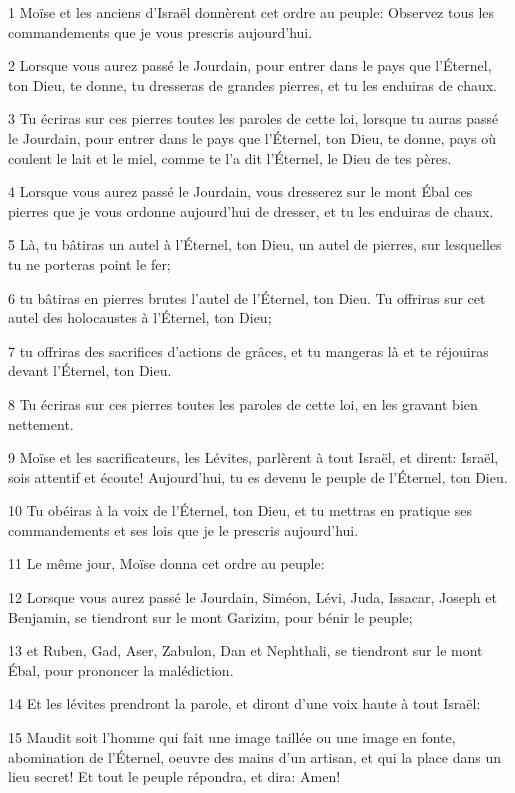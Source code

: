 \par 1 Moïse et les anciens d'Israël donnèrent cet ordre au peuple: Observez tous les commandements que je vous prescris aujourd'hui.
\par 2 Lorsque vous aurez passé le Jourdain, pour entrer dans le pays que l'Éternel, ton Dieu, te donne, tu dresseras de grandes pierres, et tu les enduiras de chaux.
\par 3 Tu écriras sur ces pierres toutes les paroles de cette loi, lorsque tu auras passé le Jourdain, pour entrer dans le pays que l'Éternel, ton Dieu, te donne, pays où coulent le lait et le miel, comme te l'a dit l'Éternel, le Dieu de tes pères.
\par 4 Lorsque vous aurez passé le Jourdain, vous dresserez sur le mont Ébal ces pierres que je vous ordonne aujourd'hui de dresser, et tu les enduiras de chaux.
\par 5 Là, tu bâtiras un autel à l'Éternel, ton Dieu, un autel de pierres, sur lesquelles tu ne porteras point le fer;
\par 6 tu bâtiras en pierres brutes l'autel de l'Éternel, ton Dieu. Tu offriras sur cet autel des holocaustes à l'Éternel, ton Dieu;
\par 7 tu offriras des sacrifices d'actions de grâces, et tu mangeras là et te réjouiras devant l'Éternel, ton Dieu.
\par 8 Tu écriras sur ces pierres toutes les paroles de cette loi, en les gravant bien nettement.
\par 9 Moïse et les sacrificateurs, les Lévites, parlèrent à tout Israël, et dirent: Israël, sois attentif et écoute! Aujourd'hui, tu es devenu le peuple de l'Éternel, ton Dieu.
\par 10 Tu obéiras à la voix de l'Éternel, ton Dieu, et tu mettras en pratique ses commandements et ses lois que je le prescris aujourd'hui.
\par 11 Le même jour, Moïse donna cet ordre au peuple:
\par 12 Lorsque vous aurez passé le Jourdain, Siméon, Lévi, Juda, Issacar, Joseph et Benjamin, se tiendront sur le mont Garizim, pour bénir le peuple;
\par 13 et Ruben, Gad, Aser, Zabulon, Dan et Nephthali, se tiendront sur le mont Ébal, pour prononcer la malédiction.
\par 14 Et les lévites prendront la parole, et diront d'une voix haute à tout Israël:
\par 15 Maudit soit l'homme qui fait une image taillée ou une image en fonte, abomination de l'Éternel, oeuvre des mains d'un artisan, et qui la place dans un lieu secret! Et tout le peuple répondra, et dira: Amen!

